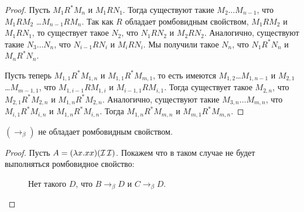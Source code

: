 \begin{proof}
    Пусть $M_1 R^{*} M_n$ и $M_1 R N_1$. Тогда существуют такие $M_2 \ldots M_{n-1}$, что $M_1 R M_2$ \ldots $M_{n-1} R M_n$.
	Так как $R$ обладает ромбовидным свойством, $M_1 R M_2$ и $M_1 R N_1$, то существует такое $N_2$,
	что $N_1 R N_2$ и $M_2 R N_2$. Аналогично, существуют такие $N_3 \ldots N_n$, что $N_{i-1} R N_{i}$ и $M_i R N_i$.
	Мы получили такое $N_n$, что $N_1 R^{*} N_n$ и $M_n R^{*} N_n$.
	
	Пусть теперь $M_{1,1}R^{*}M_{1,n}$ и $M_{1,1}R^{*}M_{m,1}$, то есть имеются $M_{1,2}$\ldots$M_{1,n-1}$ и $M_{2,1}$\ldots$M_{m-1,1}$,
	что $M_{1,i-1} R M_{1,i}$ и $M_{i-1, 1} R M_{i, 1}$.
	Тогда существует такое $M_{2,n}$, что $M_{2,1} R^{*} M_{2,n}$ и $M_{1,n} R^{*} M_{2,n}$.
	Аналогично, существуют такие $M_{3,n}\ldots M_{m,n}$, что $M_{i,1} R^{*} M_{i,n}$ и $M_{1,n} R^{*} M_{i,n}$.
	Тогда $M_{1,n} R^{*} M_{m,n}$ и $M_{m,1} R^{*} M_{m,n}$.
\end{proof}

\begin{lemma}
	$(\to_{\beta})$ не обладает ромбовидным свойством.
\end{lemma}

\begin{proof}
	Пусть $A=(\lambda{}x.x x)(\operatorname{\mathcal{I}} \operatorname{\mathcal{I}})$. Покажем что в таком случае не будет выполняться ромбовидное свойство:
	\
	\begin{figure}[ht]
		\centering
		\caption{Нет такого $D$, что $B \to_{\beta} D$ и $C \to_{\beta} D$.}
	\end{figure}	
\end{proof}


